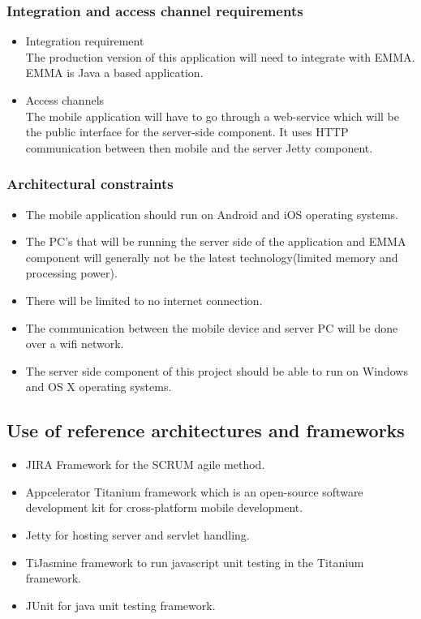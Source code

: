 \documentclass[10pt,a4paper]{article}
\begin{document}
\subsubsection{Integration and access channel requirements}
\begin{itemize}
\item Integration requirement \\
The production version of this application will need to integrate with EMMA. EMMA is Java a based application.
\item Access channels \\
The mobile application will have to go through a web-service which will be the public interface for the server-side component. It uses HTTP communication between then mobile and the server Jetty component.
\end{itemize}
\subsubsection{Architectural constraints}
\begin{itemize}
\item The mobile application should run on Android and iOS operating systems.
\item The PC's that will be running the server side of the application and EMMA component will generally not be the latest technology(limited memory and processing power).
\item There will be limited to no internet connection.
\item The communication between the mobile device and server PC will be done over a wifi network.
\item The server side component of this project should be able to run on Windows and OS X operating systems.
\end{itemize}
\subsection{Use of reference architectures and frameworks}
\begin{itemize}
\item JIRA Framework for the SCRUM agile method.
\item Appcelerator Titanium framework which is an open-source software development kit for cross-platform mobile development.
\item Jetty for hosting server and servlet handling.
\item TiJasmine framework to run javascript unit  testing in the Titanium framework.
\item JUnit for java unit testing framework.
\end{itemize}
\end{document}
